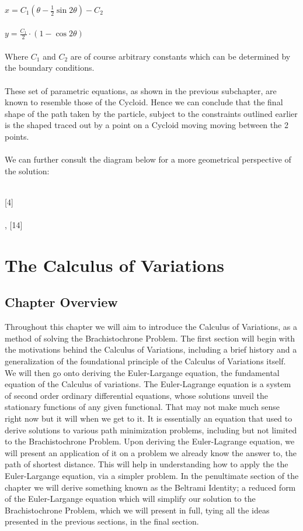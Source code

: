 \documentclass[12pt]{report}
\begin{document}
\(x = C_{1} (\theta-\frac{1}{2}\sin{2\theta}) - C_{2}\)
\\
\\
\(y =\frac{C_{1}}{2} \cdot (1-\cos{2\theta}) \)
\\
\\
Where \(C_{1}\) and \(C_{2}\) are of course arbitrary constants which can be determined by the boundary conditions.
\\
\\
These set of parametric equations, as shown in the previous subchapter, are known to resemble those of the Cycloid. Hence we can conclude that the final shape of the path taken by the particle, subject to the constraints outlined earlier is the shaped traced out by a point on a Cycloid moving moving between the 2 points.
\\
\\
We can further consult the diagram below for a more geometrical perspective of the solution:
\\
\\
 [4]
\\
\\
[8], [14]
\chapter{The Calculus of Variations}
\section{Chapter Overview}
Throughout this chapter we will aim to introduce the Calculus of Variations, as a method of solving the Brachistochrone Problem. The first section will begin with the motivations behind the Calculus of Variations, including a brief history and a generalization of the foundational principle of the Calculus of Variations itself. We will then go onto deriving the Euler-Largange equation, the fundamental equation of the Calculus of variations. The Euler-Lagrange equation is a system of second order ordinary differential equations, whose solutions unveil the stationary functions of any given functional. That may not make much sense right now but it will when we get to it. It is essentially an equation that used to derive solutions to various path minimization problems, including but not limited to the Brachistochrone Problem. Upon deriving the Euler-Lagrange equation, we will present an application of it on a problem we already know the answer to, the path of shortest distance. This will help in understanding how to apply the the Euler-Largange equation, via a simpler problem. In the penultimate section of the chapter we will derive something known as the Beltrami Identity; a reduced form of the Euler-Largange equation which will simplify our solution to the Brachistochrone Problem, which we will present in full, tying all the ideas presented in the previous sections, in the final section.
\end{document}
